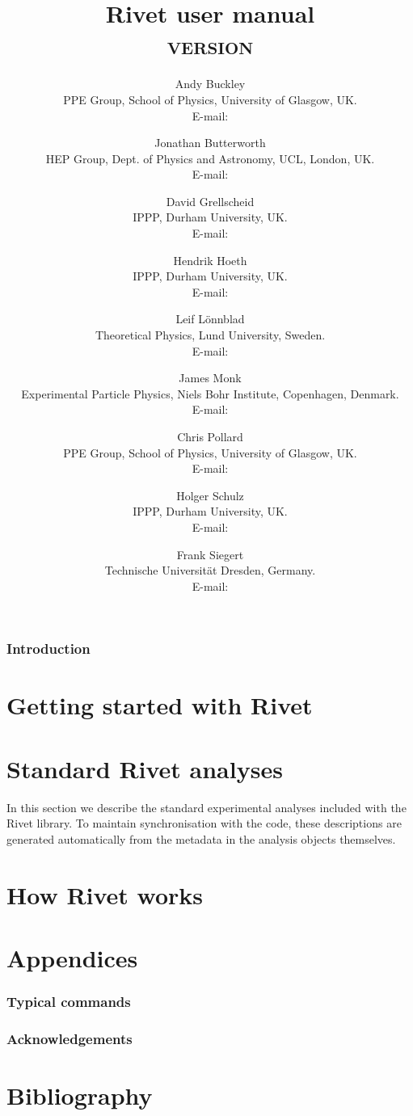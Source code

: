 \documentclass{JHEP3}
\title{Rivet user manual\\ {\smaller \textsc{version \RivetVersion}}}
\author{Andy Buckley\\ PPE Group, School of Physics, University of Glasgow, UK.\\ E-mail: \email{andy.buckley@cern.ch}}
\author{Jonathan Butterworth\\ HEP Group, Dept. of Physics and Astronomy, UCL, London, UK.\\ E-mail: \email{J.Butterworth@ucl.ac.uk}}
\author{David Grellscheid\\ IPPP, Durham University, UK.\\ E-mail: \email{david.grellscheid@durham.ac.uk}}
\author{Hendrik Hoeth\\ IPPP, Durham University, UK.\\ E-mail: \email{hendrik.hoeth@cern.ch}}
\author{Leif L\"onnblad\\ Theoretical Physics, Lund University, Sweden.\\ E-mail: \email{lonnblad@thep.lu.se}}
\author{James Monk\\ Experimental Particle Physics, Niels Bohr Institute, Copenhagen, Denmark.\\ E-mail: \email{jmonk@cern.ch}}
\author{Chris Pollard\\ PPE Group, School of Physics, University of Glasgow, UK.\\ E-mail: \email{cpollard@cern.ch}}
\author{Holger Schulz\\ IPPP, Durham University, UK.\\ E-mail: \email{holger.schulz@durham.ac.uk}}
\author{Frank Siegert\\ Technische Universit\"at Dresden, Germany.\\ E-mail: \email{frank.siegert@cern.ch}}
\begin{document}
\section{Introduction}
\label{sec:intro}


\cleardoublepage

\part{Getting started with Rivet}
\label{part:gettingstarted}


\cleardoublepage

\part{Standard Rivet analyses}
\label{part:analyses}
In this section we describe the standard experimental analyses included with the
Rivet library. To maintain synchronisation with the code, these descriptions are
generated automatically from the metadata in the analysis objects
themselves.


\cleardoublepage

\part{How Rivet works}
\label{part:writinganalyses}


\cleardoublepage

\part{Appendices}
\appendix

\section{Typical  commands}
\label{app:agilerunmc}



\section{Acknowledgements}
\label{app:acknowledgements}



\cleardoublepage

\part{Bibliography}

{\raggedright
  
}
\end{document}
